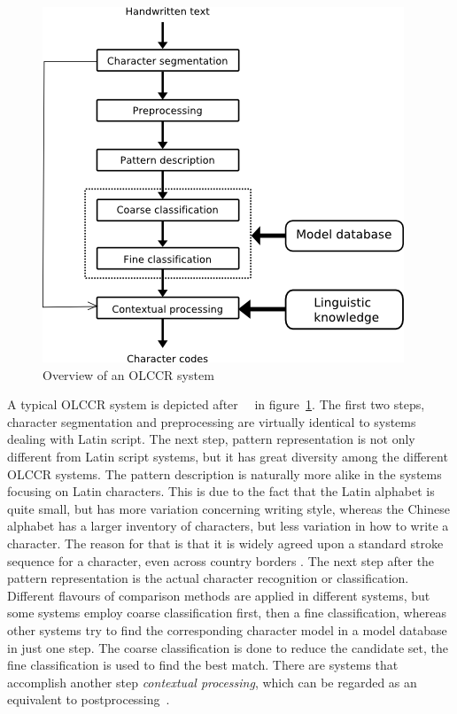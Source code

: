 \begin{figure}[htbp]
\includegraphics[scale=0.5]{images/olccrSystemOverview.png}
\caption{Overview of an OLCCR system}
\label{fig:olccrsystemoverview}
\end{figure}

A typical OLCCR system is depicted 
after~~\citeyear{LiuJaegerNakagawa2004} in 
figure~\ref{fig:olccrsystemoverview}.
The first two steps, character segmentation and preprocessing are virtually
identical to systems dealing with Latin script. The next step, pattern 
representation is not only different from Latin script systems, but it has
great diversity among the different OLCCR systems.
The pattern description is naturally more alike in the systems focusing on 
Latin characters. This is due to the fact that the Latin alphabet is quite 
small, but has more variation concerning writing style, whereas the Chinese 
alphabet has a larger inventory of characters, but less variation in how to 
write a character. The reason for that is that it is widely agreed upon a 
standard stroke sequence for a character, even across country 
borders .
The next step after the pattern representation is the actual character 
recognition or classification. Different flavours of comparison methods are
applied in different systems, but some systems employ coarse classification 
first, then a fine classification, whereas other systems try to find the 
corresponding character model in a model database in just one step.
The coarse classification is done to reduce the candidate set, the fine 
classification is used to find the best match. There are systems that 
accomplish another step \emph{contextual processing}, which can be regarded 
as an equivalent to postprocessing~.

